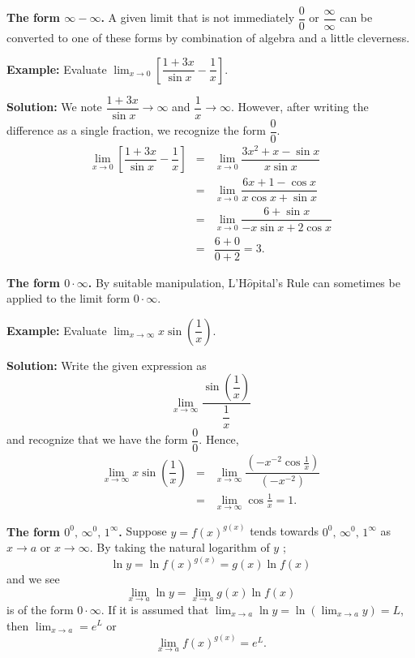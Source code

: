 \documentclass[titlepage,a4paper,12pt]{report}
\begin{document}
\noindent \textbf{The form $\infty -\infty$.} A given limit that is not immediately $\dfrac{0}{0}$ or $\dfrac{\infty}{\infty}$ can be converted to one of these forms by combination of algebra and a little cleverness. 

\noindent \textbf{Example:}  Evaluate $\displaystyle \lim _{x\rightarrow 0} \left[\dfrac{1+3x}{\sin x}-\dfrac{1}{x}\right]$.

\noindent \textbf{Solution:} We note $\dfrac{1+3x}{\sin x}\rightarrow \infty$ and $\dfrac{1}{x}\rightarrow \infty$. However, after writing the difference as a single fraction, we recognize the form $\dfrac{0}{0}$.
\begin{eqnarray*}
\lim _{x\rightarrow 0} \left[\dfrac{1+3x}{\sin x}-\dfrac{1}{x}\right] &=& \lim _{x\rightarrow 0} \dfrac{3x^2+x-\sin x}{x\sin x}\\
&=& \lim _{x\rightarrow 0} \dfrac{6x+1-\cos x}{x\cos x +\sin x}\\
&=& \lim _{x\rightarrow 0} \dfrac{6+\sin x}{-x\sin x +2\cos x } \\
&=& \dfrac{6+0}{0+2} =3.
\end{eqnarray*}

\noindent \textbf{The form $0\cdot \infty$.} By suitable manipulation, L'H$\hat{o}$pital's Rule can sometimes be applied to the limit form $0\cdot \infty$.

\noindent \textbf{Example:} Evaluate $\displaystyle \lim _{x\rightarrow \infty} x\sin \left(\dfrac{1}{x}\right)$.

\noindent \textbf{Solution:} Write the given expression as 
\begin{equation*}
\lim _{x\rightarrow \infty} \dfrac{\sin \left(\dfrac{1}{x}\right)}{\dfrac{1}{x} }
\end{equation*}
and recognize that we have the form $\dfrac{0}{0}$. Hence, 
\begin{eqnarray*}
\lim _{x\rightarrow \infty} x\sin \left(\dfrac{1}{x}\right) &=& \lim _{x\rightarrow \infty}\dfrac{(-x^{-2}\cos \frac{1}{x})}{(-x^{-2})}\\
&=& \lim _{x\rightarrow \infty} \cos \frac{1}{x} =1.
\end{eqnarray*}

\noindent \textbf{The form $0^0, \, \infty ^0, \, 1^\infty$.} Suppose $y=f(x)^{g(x)}$ tends towards   $0^0, \, \infty ^0, \, 1^\infty$ as $x\rightarrow a$ or $x\rightarrow \infty$. By taking the natural logarithm of $y$ ;
\begin{equation*}
\ln y=\ln f(x)^{g(x)} =g(x)\ln f(x)
\end{equation*}
and we see 
\begin{equation*}
\lim _{x\rightarrow a} \ln y =\lim _{x\rightarrow a} g(x)\ln f(x)
\end{equation*}
is of the form $0\cdot \infty$. If it is assumed that $\displaystyle \lim _{x\rightarrow a} \ln y =\ln (\lim _{x\rightarrow a} y)=L$, then $\displaystyle \lim _{x\rightarrow a}= e^L$ or 
\begin{equation*}
\lim _{x\rightarrow a} f(x)^{g(x)} =e^L.
\end{equation*}
\end{document}
